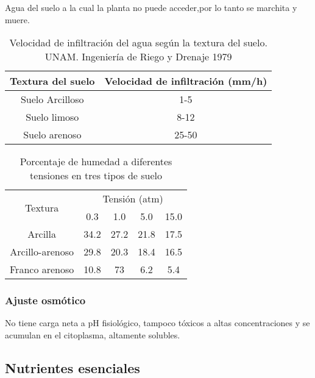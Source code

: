 \begin{definition}
    Agua del suelo a la cual la planta no puede acceder,por lo tanto se marchita y muere.
\end{definition}


\begin{table}[h!]
    \centering
    \begin{tabular}{@{}cc@{}}
    \toprule
    Textura del suelo & Velocidad de infiltración (mm/h) \\ \midrule
    Suelo Arcilloso   & 1-5                              \\
    Suelo limoso      & 8-12                             \\
    Suelo arenoso     & 25-50                            \\ \bottomrule
    \end{tabular}
    \caption{Velocidad de infiltración del agua según la textura del suelo. UNAM. Ingeniería de Riego y Drenaje 1979}
    \label{tabfv1}
    \end{table}

    \begin{table}[h!]
        \centering
        \begin{tabular}{@{}ccccc@{}}
        \toprule
        \multirow{2}{*}{Textura}& \multicolumn{4}{c}{Tensión (atm)} \\
                                & 0.3    & 1.0    & 5.0    & 15.0   \\ \midrule
        Arcilla                 & 34.2   & 27.2   & 21.8   & 17.5   \\
        Arcillo-arenoso         & 29.8   & 20.3   & 18.4   & 16.5   \\
        Franco arenoso          & 10.8   & 73     & 6.2    & 5.4    \\ \bottomrule
        \end{tabular}
        \caption{Porcentaje de humedad a diferentes tensiones en tres tipos de suelo}
        \label{tabfv2}
        \end{table}

\subsubsection{Ajuste osmótico}

No tiene carga neta a pH fisiológico, tampoco tóxicos a altas concentraciones y se acumulan en el citoplasma, altamente solubles.

\subsection{Nutrientes esenciales}

